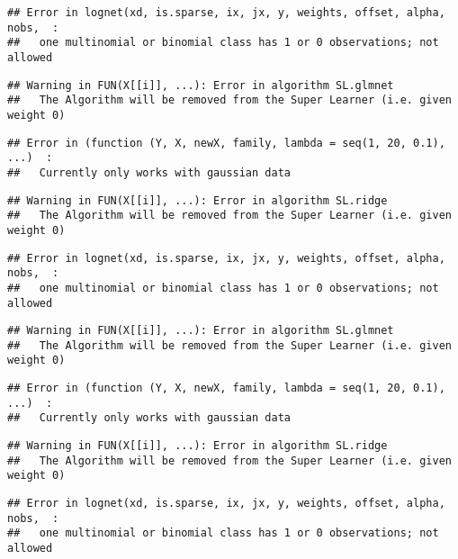 \documentclass[
]{article}
\begin{document}
\begin{verbatim}
## Error in lognet(xd, is.sparse, ix, jx, y, weights, offset, alpha, nobs,  : 
##   one multinomial or binomial class has 1 or 0 observations; not allowed
\end{verbatim}

\begin{verbatim}
## Warning in FUN(X[[i]], ...): Error in algorithm SL.glmnet 
##   The Algorithm will be removed from the Super Learner (i.e. given weight 0)
\end{verbatim}

\begin{verbatim}
## Error in (function (Y, X, newX, family, lambda = seq(1, 20, 0.1), ...)  : 
##   Currently only works with gaussian data
\end{verbatim}

\begin{verbatim}
## Warning in FUN(X[[i]], ...): Error in algorithm SL.ridge 
##   The Algorithm will be removed from the Super Learner (i.e. given weight 0)
\end{verbatim}

\begin{verbatim}
## Error in lognet(xd, is.sparse, ix, jx, y, weights, offset, alpha, nobs,  : 
##   one multinomial or binomial class has 1 or 0 observations; not allowed
\end{verbatim}

\begin{verbatim}
## Warning in FUN(X[[i]], ...): Error in algorithm SL.glmnet 
##   The Algorithm will be removed from the Super Learner (i.e. given weight 0)
\end{verbatim}

\begin{verbatim}
## Error in (function (Y, X, newX, family, lambda = seq(1, 20, 0.1), ...)  : 
##   Currently only works with gaussian data
\end{verbatim}

\begin{verbatim}
## Warning in FUN(X[[i]], ...): Error in algorithm SL.ridge 
##   The Algorithm will be removed from the Super Learner (i.e. given weight 0)
\end{verbatim}

\begin{verbatim}
## Error in lognet(xd, is.sparse, ix, jx, y, weights, offset, alpha, nobs,  : 
##   one multinomial or binomial class has 1 or 0 observations; not allowed
\end{verbatim}
\end{document}
